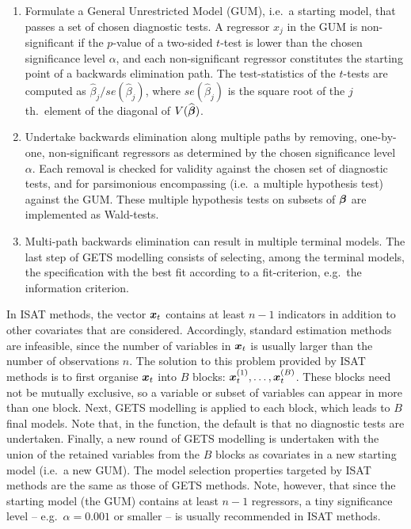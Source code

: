 \begin{enumerate}
	\item Formulate a General Unrestricted Model (GUM), i.e.\ a starting model, that passes a set of chosen diagnostic tests. A regressor $x_j$ in the GUM is non-significant if the $p$-value of a two-sided $t$-test is lower than the chosen significance level $\alpha$, and each non-significant regressor constitutes the starting point of a backwards elimination path. The test-statistics of the $t$-tests are computed as $\widehat{\beta}_j/se(\widehat{\beta}_j)$, where $se(\widehat{\beta}_j)$ is the square root of the $j$th.\ element of the diagonal of $V(\widehat{\boldsymbol{\beta}})$.
	
	\item Undertake backwards elimination along multiple paths by removing, one-by-one, non-significant regressors as determined by the chosen significance level $\alpha$. Each removal is checked for validity against the chosen set of diagnostic tests, and for parsimonious encompassing (i.e.\ a multiple hypothesis test) against the GUM. These multiple hypothesis tests on subsets of $\boldsymbol{\beta}$ are implemented as Wald-tests.
	
	\item Multi-path backwards elimination can result in multiple terminal models. The last step of GETS modelling consists of selecting, among the terminal models, the specification with the best fit according to a fit-criterion, e.g.\ the \cite{Schwarz1978} information criterion. 
\end{enumerate}

In ISAT methods, the vector $\boldsymbol{x}_t$ contains at least $n-1$ indicators in addition to other covariates that are considered. Accordingly, standard estimation methods are infeasible, since the number of variables in $\boldsymbol{x}_t$ is usually larger than the number of observations $n$. The solution to this problem provided by ISAT methods is to first organise $\boldsymbol{x}_t$ into $B$ blocks: $\boldsymbol{x}_t^{(1)}, \ldots, \boldsymbol{x}_t^{(B)}$. These blocks need not be mutually exclusive, so a variable or subset of variables can appear in more than one block. Next, GETS modelling is applied to each block, which leads to $B$ final models. Note that, in the  function, the default is that no diagnostic tests are undertaken. Finally, a new round of GETS modelling is undertaken with the union of the retained variables from the $B$ blocks as covariates in a new starting model (i.e.\ a new GUM). The model selection properties targeted by ISAT methods are the same as those of GETS methods. Note, however, that since the starting model (the GUM) contains at least $n-1$ regressors, a tiny significance level -- e.g.\ $\alpha=0.001$ or smaller -- is usually recommended in ISAT methods.

